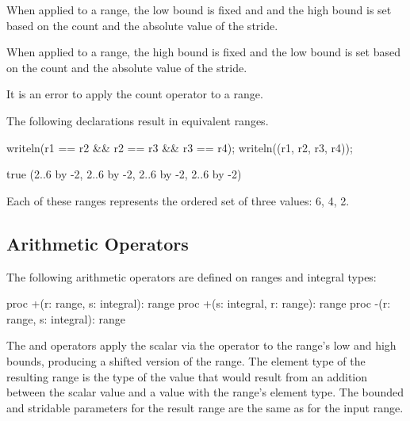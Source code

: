 When applied to a  range, the low bound
is fixed and and the high bound is set based on the count and the
absolute value of the stride.

When applied to a  range, the high
bound is fixed and the low bound is set based on the count and the
absolute value of the stride.

It is an error to apply the count operator to a
 range.

\begin{example}
The following declarations result in equivalent ranges.
\begin{chapelpre}
\end{chapelpre}
\begin{chapelpost}
writeln(r1 == r2 \&\& r2 == r3 \&\& r3 == r4);
writeln((r1, r2, r3, r4));
\end{chapelpost}
\begin{chapeloutput}
true
(2..6 by -2, 2..6 by -2, 2..6 by -2, 2..6 by -2)
\end{chapeloutput}
Each of these ranges represents the ordered set of three values: 6, 4, 2.
\end{example}

\subsection{Arithmetic Operators}
\label{Range_Arithmetic}

The following arithmetic operators are defined on ranges and integral
types:

\begin{chapel}
proc +(r: range, s: integral): range
proc +(s: integral, r: range): range
proc -(r: range, s: integral): range
\end{chapel}

The \chpl{+} and \chpl{-} operators apply the scalar via the operator
to the range's low and high bounds, producing a shifted version of the
range.  The element type of the resulting range is the type of the value
that would result from an addition between the scalar value and a value
with the range's element type.  The bounded and stridable parameters for
the result range are the same as for the input range.

